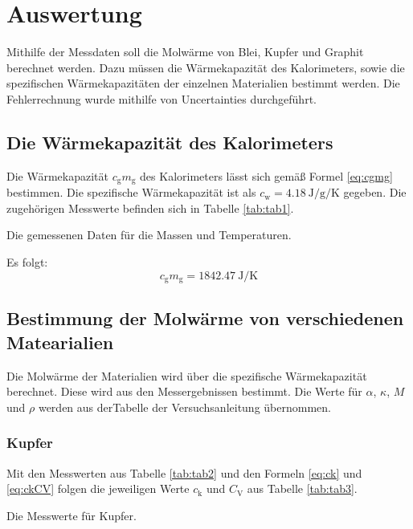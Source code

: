 \section{Auswertung}
\label{sec:Auswertung}

Mithilfe der Messdaten soll die Molwärme von Blei, Kupfer und Graphit berechnet werden. Dazu müssen die Wärmekapazität des Kalorimeters, sowie die spezifischen Wärmekapazitäten der einzelnen Materialien bestimmt werden.
Die Fehlerrechnung wurde mithilfe von Uncertainties \cite{uncertainties} durchgeführt.

\subsection{Die Wärmekapazität des Kalorimeters}

Die Wärmekapazität $c_\text{g}m_\text{g}$ des Kalorimeters lässt sich gemäß Formel \eqref{eq:cgmg} bestimmen. Die spezifische Wärmekapazität ist als $c_\text{w} = \SI{4.18}{\joule\per\gram\per\kelvin}$ \cite{V201} gegeben. Die zugehörigen Messwerte befinden sich in Tabelle \ref{tab:tab1}.

\begin{table}
	\centering
	\caption{Die gemessenen Daten für die Massen und Temperaturen.}
	
	\label{tab:tab1}
\end{table}

Es folgt:
\begin{displaymath}
	c_\text{g}m_\text{g} = \SI{1842,47}{\joule\per\kelvin}
\end{displaymath}

\subsection{Bestimmung der Molwärme von verschiedenen Matearialien}

Die Molwärme der Materialien wird über die spezifische Wärmekapazität berechnet. Diese wird aus den Messergebnissen bestimmt.
Die Werte für $\alpha$, $\kappa$, $M$ und $\rho$ werden aus derTabelle der Versuchsanleitung übernommen\cite{V201}.

\subsubsection{Kupfer}

Mit den Messwerten aus Tabelle \ref{tab:tab2} und den Formeln \eqref{eq:ck} und \eqref{eq:ckCV} folgen die jeweiligen Werte $c_\text{k}$ und $C_\text{V}$ aus Tabelle \ref{tab:tab3}.
\begin{table}
	\centering
	\caption{Die Messwerte für Kupfer.}
	
	\label{tab:tab2}
\end{table}

